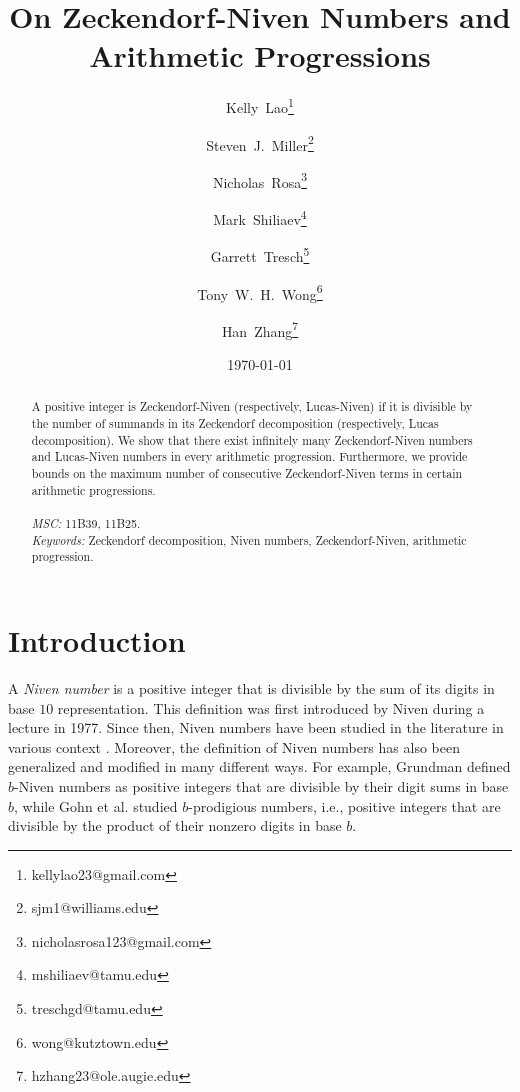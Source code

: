\documentclass[12pt]{article}
\theoremstyle{definition}
\begin{document}
\title{On Zeckendorf-Niven Numbers and Arithmetic Progressions}
\author[1]{Kelly~Lao\thanks{kellylao23@gmail.com}}
\author[2]{Steven~J.~Miller\thanks{sjm1@williams.edu}}
\author[3]{Nicholas~Rosa\thanks{nicholasrosa123@gmail.com}}
\author[4]{Mark~Shiliaev\thanks{mshiliaev@tamu.edu}}
\author[4]{Garrett~Tresch\thanks{treschgd@tamu.edu}}
\author[5]{Tony~W.~H.~Wong\thanks{wong@kutztown.edu}}
\author[6]{Han~Zhang\thanks{hzhang23@ole.augie.edu}}
\date{\today}

\maketitle

\begin{abstract}
A positive integer is Zeckendorf-Niven (respectively, Lucas-Niven) if it is divisible by the number of summands in its Zeckendorf decomposition (respectively, Lucas decomposition). We show that there exist infinitely many Zeckendorf-Niven numbers and Lucas-Niven numbers in every arithmetic progression. Furthermore, we provide bounds on the maximum number of consecutive Zeckendorf-Niven terms in certain arithmetic progressions.\\\\
\textit{MSC:} 11B39, 11B25.\\
\textit{Keywords:} Zeckendorf decomposition, Niven numbers, Zeckendorf-Niven, arithmetic progression.
\end{abstract}



\section{Introduction}

A \emph{Niven number} is a positive integer that is divisible by the sum of its digits in base $10$ representation. This definition was first introduced by Niven during a lecture in 1977. Since then, Niven numbers have been studied in the literature in various context \cite{ck1988,ck1993,costello,ddk,kennedy,kgb,mcdaniel}. Moreover, the definition of Niven numbers has also been generalized and modified in many different ways. For example, Grundman \cite{g1994} defined $b$-Niven numbers as positive integers that are divisible by their digit sums in base $b$, while Gohn et al. \cite{ghlssw} studied $b$-prodigious numbers, i.e., positive integers that are divisible by the product of their nonzero digits in base $b$.
\end{document}
